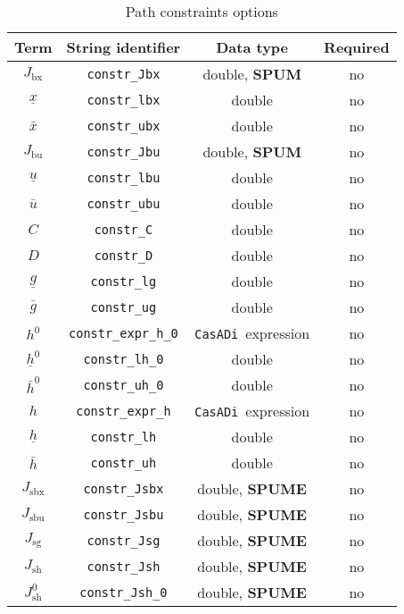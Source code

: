 \documentclass[english]{article}
\newcommand{\code}[1]{\texttt{#1}}
\newcommand{\casadi}{\texttt{CasADi}}
\newcommand{\ind}[1]{_{\textrm{#1}}}
\newcommand{\initial}{^{\textrm{0}}}
\newcommand{\optional}{no}
\begin{document}
\begin{table}[ht!]
    \centering
    \caption{Path constraints options} \label{tab:constraints:path}
    \begin{tabular}{cccc}
        \toprule
        Term & String identifier & Data type & Required \\ \midrule
        $J\ind{bx}$ & \code{constr\_Jbx}    & double, \textbf{SPUM} & \optional  \\
        $\underline{x} $    & \code{constr\_lbx}     & double  & \optional  \\
        $\bar{x} $  & \code{constr\_ubx}     & double  & \optional   \\ [1em]
        $J\ind{bu}$ & \code{constr\_Jbu}    & double, \textbf{SPUM}   & \optional    \\
        $\underline{u} $    & \code{constr\_lbu}     & double   & \optional   \\
        $\bar{u} $         & \code{constr\_ubu}     & double  & \optional   \\ [1em]
        $C$ & \code{constr\_C}    & double  & \optional \\
        $D $    & \code{constr\_D}     & double  & \optional \\
        $\underline{g} $    & \code{constr\_lg}     & double  & \optional    \\
        $\bar{g} $         & \code{constr\_ug}     & double  & \optional   \\ [1em]
        $ h\initial $ & \code{constr\_expr\_h\_0}    & \casadi~expression  & \optional   \\
        $\underline{h}\initial $    & \code{constr\_lh\_0}     & double   & \optional   \\
        $\bar{h}\initial $         & \code{constr\_uh\_0}     & double  & \optional   \\ [1em]
        $ h $ & \code{constr\_expr\_h}    & \casadi~expression  & \optional   \\
        $\underline{h} $    & \code{constr\_lh}     & double   & \optional   \\
        $\bar{h} $         & \code{constr\_uh}     & double  & \optional   \\ [1em]
        $ J\ind{sbx} $ & \code{constr\_Jsbx} & double, \textbf{SPUME} & \optional  \\
        $ J\ind{sbu} $ & \code{constr\_Jsbu} & double, \textbf{SPUME}  & \optional \\
        $ J\ind{sg} $ & \code{constr\_Jsg} & double, \textbf{SPUME} & \optional  \\
        $ J\ind{sh} $ & \code{constr\_Jsh} & double, \textbf{SPUME}  & \optional  \\
        $ J\ind{sh}\initial $ & \code{constr\_Jsh\_0} & double, \textbf{SPUME}  & \optional  \\
        \bottomrule
    \end{tabular}
\end{table}
%
\end{document}

